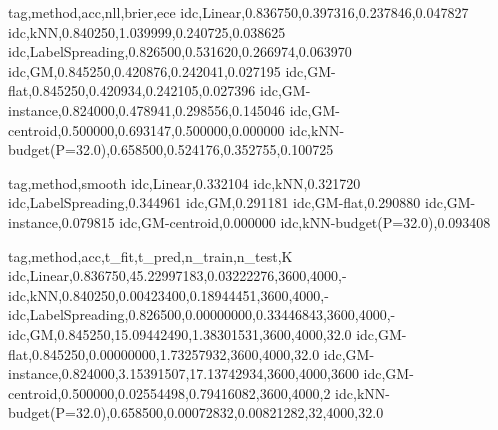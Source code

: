 tag,method,acc,nll,brier,ece
idc,Linear,0.836750,0.397316,0.237846,0.047827
idc,kNN,0.840250,1.039999,0.240725,0.038625
idc,LabelSpreading,0.826500,0.531620,0.266974,0.063970
idc,GM,0.845250,0.420876,0.242041,0.027195
idc,GM-flat,0.845250,0.420934,0.242105,0.027396
idc,GM-instance,0.824000,0.478941,0.298556,0.145046
idc,GM-centroid,0.500000,0.693147,0.500000,0.000000
idc,kNN-budget(P=32.0),0.658500,0.524176,0.352755,0.100725


tag,method,smooth
idc,Linear,0.332104
idc,kNN,0.321720
idc,LabelSpreading,0.344961
idc,GM,0.291181
idc,GM-flat,0.290880
idc,GM-instance,0.079815
idc,GM-centroid,0.000000
idc,kNN-budget(P=32.0),0.093408


tag,method,acc,t_fit,t_pred,n_train,n_test,K
idc,Linear,0.836750,45.22997183,0.03222276,3600,4000,-
idc,kNN,0.840250,0.00423400,0.18944451,3600,4000,-
idc,LabelSpreading,0.826500,0.00000000,0.33446843,3600,4000,-
idc,GM,0.845250,15.09442490,1.38301531,3600,4000,32.0
idc,GM-flat,0.845250,0.00000000,1.73257932,3600,4000,32.0
idc,GM-instance,0.824000,3.15391507,17.13742934,3600,4000,3600
idc,GM-centroid,0.500000,0.02554498,0.79416082,3600,4000,2
idc,kNN-budget(P=32.0),0.658500,0.00072832,0.00821282,32,4000,32.0
